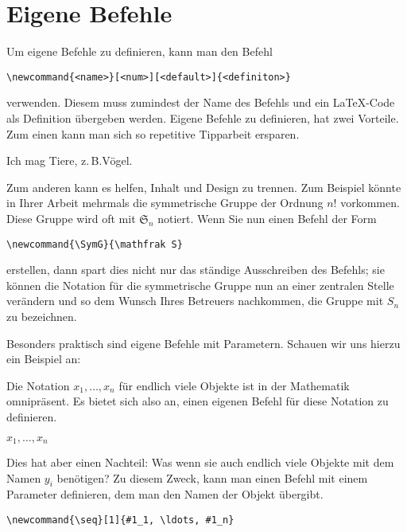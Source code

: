 
\section{Eigene Befehle}

Um eigene Befehle zu definieren, kann man den Befehl
\begin{lstlisting}
\newcommand{<name>}[<num>][<default>]{<definiton>}
\end{lstlisting}
verwenden.
Diesem muss zumindest der Name des Befehls und ein \LaTeX-Code als Definition übergeben werden.
Eigene Befehle zu definieren, hat zwei Vorteile. Zum einen kann man sich so repetitive Tipparbeit ersparen.

\begin{LTXexample}
\newcommand{\zB}{z.\,B.}

Ich mag Tiere, \zB Vögel.
\end{LTXexample}

Zum anderen kann es helfen, Inhalt und Design zu trennen.
Zum Beispiel könnte in Ihrer Arbeit mehrmals die symmetrische Gruppe der Ordnung $ n! $ vorkommen.
Diese Gruppe wird oft mit $ \mathfrak S_n $ notiert.
Wenn Sie nun einen Befehl der Form
\begin{lstlisting}
\newcommand{\SymG}{\mathfrak S}
\end{lstlisting}
erstellen, dann spart dies nicht nur das ständige Ausschreiben des Befehls;
sie können die Notation für die symmetrische Gruppe nun an einer zentralen Stelle verändern und so dem Wunsch Ihres Betreuers nachkommen, die Gruppe mit $ S_n $ zu bezeichnen.

Besonders praktisch sind eigene Befehle mit Parametern. Schauen wir uns hierzu ein Beispiel an:

Die Notation $ x_1, \ldots, x_n$ für endlich viele Objekte ist in der Mathematik omnipräsent.
Es bietet sich also an, einen eigenen Befehl für diese Notation zu definieren.
\begin{LTXexample}
\newcommand{\seqx}
        {x_1, \ldots, x_n}
$\seqx$
\end{LTXexample}

Dies hat aber einen Nachteil: Was wenn sie auch endlich viele Objekte mit dem Namen $ y_i $ benötigen?
Zu diesem Zweck, kann man einen Befehl mit einem Parameter definieren, dem man den Namen der Objekt übergibt.
\begin{lstlisting}
\newcommand{\seq}[1]{#1_1, \ldots, #1_n}
\end{lstlisting}

